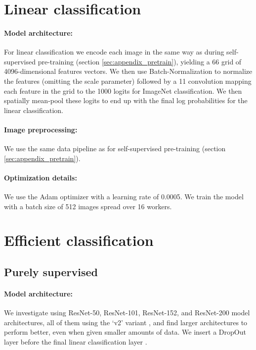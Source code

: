 \documentclass{article}
\begin{document}
\section{Linear classification}
\label{sec:appendix_linear}

\paragraph{Model architecture:} For linear classification we encode each image in the same way as during self-supervised pre-training (section \ref{sec:appendix_pretrain}), yielding a 66 grid of 4096-dimensional features vectors. We then use Batch-Normalization \citep{ioffe2015batch} to normalize the features (omitting the scale parameter) followed by a 11 convolution mapping each feature in the grid to the 1000 logits for ImageNet classification. We then spatially mean-pool these logits to end up with the final log probabilities for the linear classification.

\paragraph{Image preprocessing: } We use the same data pipeline as for self-supervised pre-training (section \ref{sec:appendix_pretrain}). 

\paragraph{Optimization details:} We use the Adam optimizer with a learning rate of 0.0005. We train the model with a batch size of 512 images spread over 16 workers.


\section{Efficient classification}
\subsection{Purely supervised}
\label{sec:appendix_efficient_sup}

\paragraph{Model architecture:} We investigate using ResNet-50, ResNet-101, ResNet-152, and ResNet-200 model architectures, all of them using the `v2' variant \citep{he2016identity}, and find larger architectures to perform better, even when given smaller amounts of data. We insert a DropOut layer before the final linear classification layer \citep{srivastava2014dropout}. 
\end{document}
